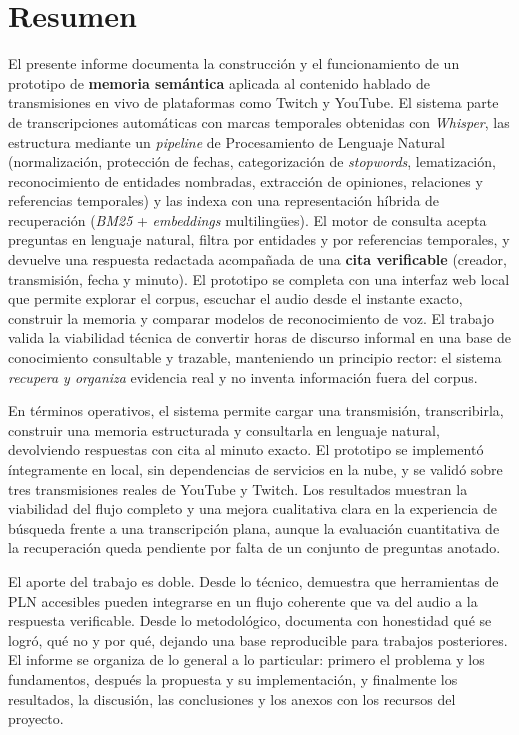 \documentclass[12pt,a4paper]{article}
\begin{document}
\section{Resumen}
\label{sec:resumen}

El presente informe documenta la construcción y el funcionamiento de un prototipo de \textbf{memoria semántica} aplicada al contenido hablado de transmisiones en vivo de plataformas como Twitch y YouTube. El sistema parte de transcripciones automáticas con marcas temporales obtenidas con \emph{Whisper}, las estructura mediante un \emph{pipeline} de Procesamiento de Lenguaje Natural (normalización, protección de fechas, categorización de \emph{stopwords}, lematización, reconocimiento de entidades nombradas, extracción de opiniones, relaciones y referencias temporales) y las indexa con una representación híbrida de recuperación (\emph{BM25} + \emph{embeddings} multilingües). El motor de consulta acepta preguntas en lenguaje natural, filtra por entidades y por referencias temporales, y devuelve una respuesta redactada acompañada de una \textbf{cita verificable} (creador, transmisión, fecha y minuto). El prototipo se completa con una interfaz web local que permite explorar el corpus, escuchar el audio desde el instante exacto, construir la memoria y comparar modelos de reconocimiento de voz. El trabajo valida la viabilidad técnica de convertir horas de discurso informal en una base de conocimiento consultable y trazable, manteniendo un principio rector: el sistema \emph{recupera y organiza} evidencia real y no inventa información fuera del corpus.


En términos operativos, el sistema permite cargar una transmisión, transcribirla, construir una memoria estructurada y consultarla en lenguaje natural, devolviendo respuestas con cita al minuto exacto. El prototipo se implementó íntegramente en local, sin dependencias de servicios en la nube, y se validó sobre tres transmisiones reales de YouTube y Twitch. Los resultados muestran la viabilidad del flujo completo y una mejora cualitativa clara en la experiencia de búsqueda frente a una transcripción plana, aunque la evaluación cuantitativa de la recuperación queda pendiente por falta de un conjunto de preguntas anotado.

El aporte del trabajo es doble. Desde lo técnico, demuestra que herramientas de PLN accesibles pueden integrarse en un flujo coherente que va del audio a la respuesta verificable. Desde lo metodológico, documenta con honestidad qué se logró, qué no y por qué, dejando una base reproducible para trabajos posteriores. El informe se organiza de lo general a lo particular: primero el problema y los fundamentos, después la propuesta y su implementación, y finalmente los resultados, la discusión, las conclusiones y los anexos con los recursos del proyecto.
\end{document}
